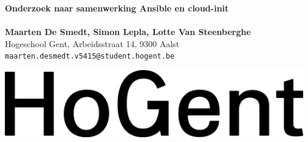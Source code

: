 \documentclass[a0,portrait]{a0poster}
\begin{document}


\begin{minipage}[t]{0.75\linewidth}
\VeryHuge \color{HoGentAccent1} \textbf{Onderzoek naar samenwerking Ansible en cloud-init} \color{Black}\\ %
\Huge\textit{}\\[2.4cm] %
\huge \textbf{Maarten De Smedt, Simon Lepla, Lotte Van Steenberghe}\\[0.5cm] %
\huge Hogeschool Gent,  Arbeidsstraat 14, 9300 Aalst\\[0.4cm] %
\Large \texttt{maarten.desmedt.v5415@student.hogent.be} \\
\end{minipage}
%
\begin{minipage}[t]{0.25\linewidth}
\includegraphics[width=13cm,right]{figures/HG-woordmerk.jpg} 

\end{minipage}

\vspace{1cm} %

\end{document}
